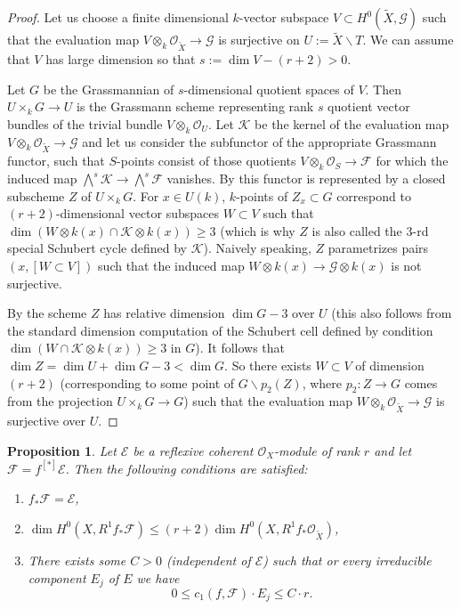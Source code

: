 \documentclass[twoside, 11pt]{article}
\theoremstyle{plain}
\newtheorem{Proposition}[Thm]{\sc Proposition}
\theoremstyle{definition}
\theoremstyle{remark}
\newcommand{\cE}{{\mathcal E}}
\newcommand{\cF}{{\mathcal F}}
\newcommand{\cG}{{\mathcal G}}
\newcommand{\cK}{{\mathcal K}}
\newcommand{\cO}{{\mathcal O}}
\begin{document}
\begin{proof}
Let us choose a finite dimensional $k$-vector subspace $V\subset H^0(\tilde X , \cG)$ such that the evaluation map $V\otimes _k\cO_{\tilde X}\to \cG$ is surjective on $U:= \tilde X\backslash T$. 
We can assume that $V$ has large dimension so that $s:=\dim V-(r+2)>0$.

Let $G$ be the Grassmannian of $s$-dimensional quotient spaces of $V$. 
Then $U\times _kG\to U$ is the Grassmann scheme representing rank $s$ quotient vector bundles of the trivial bundle  $V\otimes _k \cO_U$. Let $\cK$ be the kernel of the evaluation map $V\otimes _k\cO_{\tilde X}\to \cG$ and
let us consider the subfunctor of the appropriate Grassmann functor, such that $S$-points consist of those quotients $V\otimes _k\cO_S\to \cF$ for which the induced map $\bigwedge ^{s}\cK \to \bigwedge ^{s} \cF$ vanishes. By \cite[Proposition 2.2]{Kl} this functor is represented by a closed subscheme $Z$ of  $U\times _kG$. For $x\in U(k)$, $k$-points of $Z_x\subset G$ correspond to $(r+2)$-dimensional vector subspaces $W\subset V$ such that  $\dim (W\otimes k(x)\cap \cK\otimes k(x))\ge 3$ (which is why $Z$ is also called the $3$-rd special Schubert cycle defined by $\cK$). Naively speaking, $Z$ parametrizes pairs $(x,[W\subset V])$ such that the induced map $W\otimes k(x)\to  \cG\otimes k(x)$ is not surjective. 

By \cite[Corollary 2.9]{Kl} the scheme $Z$ has relative dimension $\dim G-3$ over $U$ (this also follows from the standard dimension computation of the Schubert cell  defined by condition $\dim (W\cap \cK\otimes k(x))\ge 3$ in $G$). It follows that $\dim Z=\dim U+\dim G-3 <\dim G$. So there exists $W\subset V$ of dimension $(r+2)$  (corresponding to some point of $G\backslash p_2(Z)$, where $p_2: Z\to G$ comes from the projection $U\times _kG\to G$) such that the evaluation map $W\otimes _k\cO_{\tilde X}\to \cG$ is surjective over $U$. 
\end{proof}


\begin{Proposition}\label{c_1-full-sheaves}
Let $\cE$ be a reflexive coherent $\cO_X$-module of rank $r$ and let $\cF= f^{[*]}\cE$.
Then the following conditions are satisfied:
\begin{enumerate}
\item $f_*\cF=\cE$,
\item $\dim  H^0(X, R^1 f_*\cF)\le (r+2)\dim  H^0(X, R^1 f_*\cO _{\tilde X})$,
\item There exists some $C>0$ (independent of $\cE$) such that or every irreducible component $E_j$ of $E$ we have
$$0\le c_1(f, \cF)\cdot E_j\le  C\cdot r.$$
\end{enumerate}
\end{Proposition}
\end{document}
